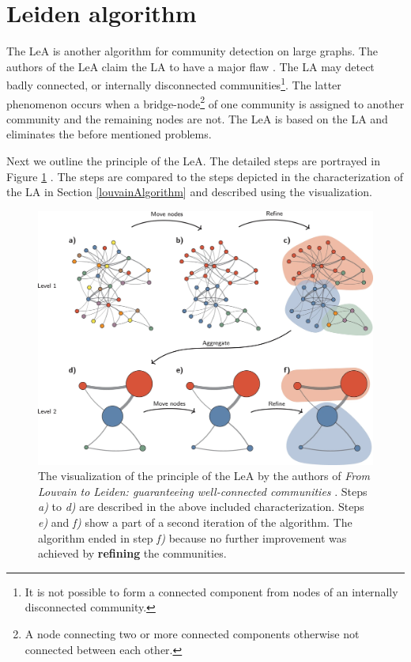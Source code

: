 \section{Leiden algorithm} \label{leidenAlgorithm}
The LeA is another algorithm for community detection on large graphs. The authors of the LeA claim the LA to have a major flaw \cite{leidenAlgorithm}. The LA may detect badly connected, or internally disconnected communities\footnote{It is not possible to form a connected component from nodes of an internally disconnected community.}. The latter phenomenon occurs when a bridge-node\footnote{A node connecting two or more connected components otherwise not connected between each other.} of one community is assigned to another community and the remaining nodes are not. The LeA is based on the LA and eliminates the before mentioned problems. 

Next we outline the principle of the LeA. The detailed steps are portrayed in Figure \ref{leidenVisualization} \cite{leidenVisualization}. The steps are compared to the steps depicted in the characterization of the LA in Section \ref{louvainAlgorithm} and described using the visualization.
\begin{figure}[ht!]
  \centering
  \includegraphics[width=\textwidth]{Images/leidenVisualization.png}
  \caption{The visualization of the principle of the LeA \cite{leidenVisualization} by the authors of \textit{From Louvain to Leiden: guaranteeing well-connected communities} \cite{leidenAlgorithm}. Steps \textit{a)} to \textit{d)} are described in the above included characterization. Steps \textit{e)} and \textit{f)} show a part of a second iteration of the algorithm. The algorithm ended in step \textit{f)} because no further improvement was achieved by \textbf{refining} the communities.}
  \label{leidenVisualization}
\end{figure}    
 

